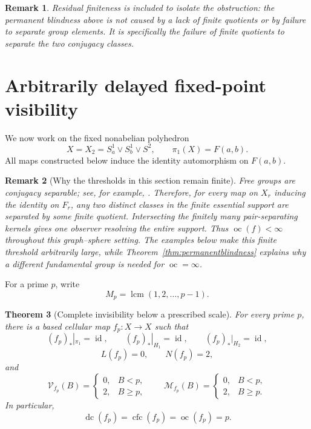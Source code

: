 \documentclass[11pt]{article}
\newtheorem{theorem}{Theorem}[section]
\newtheorem{remark}[theorem]{Remark}
\DeclareMathOperator{\oc}{oc}
\DeclareMathOperator{\dc}{dc}
\DeclareMathOperator{\cfc}{cfc}
\DeclareMathOperator{\id}{id}
\newcommand{\VN}{\mathcal V}
\newcommand{\MN}{\mathcal M}
\begin{document}
\begin{remark}
Residual finiteness is included to isolate the obstruction: the permanent
blindness above is not caused by a lack of finite quotients or by failure to
separate group elements.  It is specifically the failure of finite quotients
to separate the two conjugacy classes.
\end{remark}

\section{Arbitrarily delayed fixed-point visibility}

We now work on the fixed nonabelian polyhedron
\[
  X=X_2=S^1_a\vee S^1_b\vee S^2,
  \qquad
  \pi_1(X)=F(a,b).
\]
All maps constructed below induce the identity automorphism on $F(a,b)$.

\begin{remark}[Why the thresholds in this section remain finite]
\label{rem:freefinite}
Free groups are conjugacy separable; see, for example,
\cite{BogopolskiGrunewald}.  Therefore, for every map on $X_r$ inducing the
identity on $F_r$, any two distinct classes in the finite essential support
are separated by some finite quotient.  Intersecting the finitely many
pair-separating kernels gives one observer resolving the entire support.
Thus $\oc(f)<\infty$ throughout this graph--sphere setting.  The examples
below make this finite threshold arbitrarily large, while
Theorem~\ref{thm:permanentblindness} explains why a different fundamental
group is needed for $\oc=\infty$.
\end{remark}

For a prime $p$, write
\[
  M_p=\operatorname{lcm}(1,2,\dots,p-1).
\]

\begin{theorem}[Complete invisibility below a prescribed scale]
\label{thm:delayedzero}
For every prime $p$, there is a based cellular map $f_p\colon X\to X$ such
that
\[
  (f_p)_*|_{\pi_1}=\id,
  \qquad
  (f_p)_*|_{H_1}=\id,
  \qquad
  (f_p)_*|_{H_2}=\id,
\]
\[
  L(f_p)=0,
  \qquad
  N(f_p)=2,
\]
and
\[
  \VN_{f_p}(B)=
  \begin{cases}
  0,&B<p,\\[1mm]
  2,&B\ge p,
  \end{cases}
  \qquad
  \MN_{f_p}(B)=
  \begin{cases}
  0,&B<p,\\[1mm]
  2,&B\ge p.
  \end{cases}
\]
In particular,
\[
  \dc(f_p)=\cfc(f_p)=\oc(f_p)=p.
\]
\end{theorem}
\end{document}
